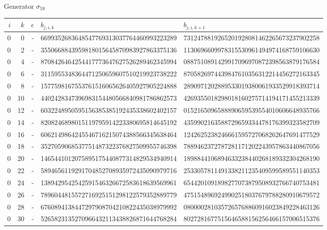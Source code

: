 \par\medskip\normalfont\normalsize Generator $\sigma_{59}$\par\smallskip
\fontsize{7.6}{9.2}\selectfont\ttfamily
\begin{longtable}{rrrll}
$i$ & $k$ & $\epsilon$ & $b_{j,i,k}$ & $b_{j,i,k+1}$ \\ \hline\endhead
0 & 0 & - & 6699352683648547769313037764460993223289 & 7312478819265201928081462265673237902258 \\
0 & 2 & - & 3550668843959818015645870983927863375136 & 1130696609978315530961494974168759106630 \\
0 & 4 & - & 8708426464254417773647627526289462345994 & 0887510891429917096970872398563879176584 \\
0 & 6 & - & 3115955348364471250659607510219923738222 & 8705826974439847610356312214456272163345 \\
0 & 8 & - & 1577598167553761516065626405927905224888 & 2890971202889533019380061933529918393714 \\
0 & 10 & - & 4402428347396983154480566840981786862573 & 4269355018298018160275714194171455213339 \\
0 & 12 & - & 6032248950595156385385192435338602402157 & 0152165096588890659539554010606648935766 \\
0 & 14 & - & 8208246898015119795914223380695814645192 & 4359902163588729659334478176399323582709 \\
0 & 16 & - & 6062149864245546716215074388566345638464 & 1242625238246661595727068262647691477529 \\
0 & 18 & - & 3527059068537751487322376827509955746398 & 7889462372787281171202243957863440867056 \\
0 & 20 & - & 1465441012075895175440877314829534940914 & 1898844106894633238440268189332304268190 \\
0 & 22 & - & 5894656119291704852708935972435090979716 & 2533057811491338211235409599589551140353 \\
0 & 24 & - & 1389429542542591546326672583618639569961 & 6544201091898277073879508932766740753481 \\
0 & 26 & - & 7896044815572716925151298122579352889779 & 4751548969249902518037679788280910679572 \\
0 & 28 & - & 6760894138447297908704210822435038979992 & 0800002810357265768860916023849228463126 \\
0 & 30 & - & 5265823135270966432113438826871644768284 & 8027281677515646588156256466157006515376 \\

\end{longtable}
